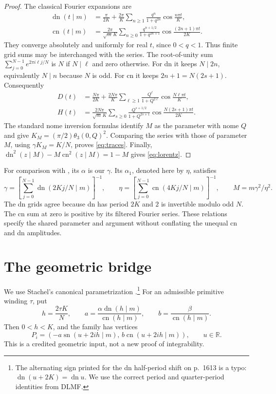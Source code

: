 \documentclass[11pt]{article}
\newcommand{\sn}{\operatorname{sn}}
\newcommand{\cn}{\operatorname{cn}}
\newcommand{\dn}{\operatorname{dn}}
\begin{document}
\begin{proof}
The classical Fourier expansions \cite[22.11.2--3]{DLMF} are
\begin{align*}
 \dn(t\mid m)&=\frac\pi{2K}
  +\frac{2\pi}K\sum_{n\geq1}
       \frac{q^n}{1+q^{2n}}\cos\frac{n\pi t}K,\\
 \cn(t\mid m)&=\frac{2\pi}{\sqrt m\,K}\sum_{n\geq0}
       \frac{q^{n+1/2}}{1+q^{2n+1}}
           \cos\frac{(2n+1)\pi t}{2K}.
\end{align*}
They converge absolutely and uniformly for real \(t\), since \(0<q<1\).
Thus finite grid sums may be interchanged with the series.
The root-of-unity sum
\(\sum_{j=0}^{N-1}e^{2\pi i\ell j/N}\) is \(N\) if \(N\mid\ell\)
and zero otherwise. For dn it keeps \(N\mid2n\), equivalently
\(N\mid n\) because \(N\) is odd. For cn it keeps
\(2n+1=N(2s+1)\). Consequently
\begin{align*}
 D(t)&=\frac{N\pi}{2K}
  +\frac{2N\pi}K\sum_{\ell\geq1}
       \frac{Q^\ell}{1+Q^{2\ell}}\cos\frac{N\ell\pi t}K,\\
 H(t)&=\frac{2N\pi}{\sqrt m\,K}\sum_{s\geq0}
       \frac{Q^{s+1/2}}{1+Q^{2s+1}}
           \cos\frac{N(2s+1)\pi t}{2K}.
\end{align*}
The standard nome inversion formulas
\cite[22.2.1--2]{DLMF} identify \(M\) as the parameter with nome \(Q\)
and give \(K_M=(\pi/2)\theta_3(0,Q)^2\).
Comparing the series with those of parameter \(M\), using
\(\gamma K_M=K/N\), proves \eqref{eq:traces}.
Finally, \(\dn^2(z\mid M)-M\cn^2(z\mid M)=1-M\) gives
\eqref{eq:lorentz}.
\end{proof}

For comparison with \cite{KSlanden}, its \(\alpha\) is our \(\gamma\).
Its \(\alpha_1\), denoted here by \(\eta\), satisfies
\[
 \gamma=\left[\sum_{j=0}^{N-1}\dn(2Kj/N\mid m)\right]^{-1},\qquad
 \eta=\left[\sum_{j=0}^{N-1}\cn(4Kj/N\mid m)\right]^{-1},\qquad
 M=m\gamma^2/\eta^2.
\]
The dn grids agree because dn has period \(2K\) and \(2\) is
invertible modulo odd \(N\). The cn sum at zero is positive by its
filtered Fourier series. These relations specify the shared parameter
and argument without conflating the unequal cn and dn amplitudes.

\section{The geometric bridge}

We use Stachel's canonical parametrization
\cite[Theorem~4.3 and Eq.~(4.9)]{Stachel}.\footnote{The alternating
sign printed for the dn half-period shift on p.~1613 is a typo:
\(\dn(u+2K)=\dn u\). We use the correct period and quarter-period
identities from DLMF.} For an admissible primitive
winding \(\tau\), put
\[
 h=\frac{2\tau K}N,\qquad
 a=\frac{\alpha\dn(h\mid m)}{\cn(h\mid m)},\qquad
 b=\frac{\beta}{\cn(h\mid m)}.
\]
Then \(0<h<K\), and the family has vertices
\[
 P_i=(-a\sn(u+2ih\mid m),\,b\cn(u+2ih\mid m)),\qquad u\in\mathbb R.
\]
This is a credited geometric input, not a new proof of integrability.
\end{document}
